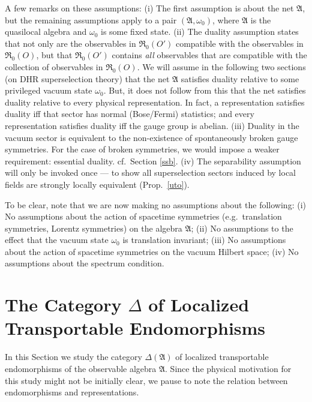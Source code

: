 \documentclass[12pt]{article}
\newcommand{\alg}[1]{\mathfrak{#1}}
\theoremstyle{definition}
\theoremstyle{definition}
\theoremstyle{remark}
\def\al#1{{\mathfrak #1}}
\def\om{\omega} \def\Om{\Omega} \def\dd{\partial} \def\D{\Delta}
\begin{document}
A few remarks on these assumptions: (i) The first assumption is about
the net $\al A$, but the remaining assumptions apply to a pair $(\al
A,\om _0)$, where $\al A$ is the quasilocal algebra and $\om _0$ is
some fixed state.  (ii) The duality assumption states that not only
are the observables in $\alg{R}_0(O')$ compatible with the observables
in $\alg{R}_0(O)$, but that $\alg{R}_0(O')$ contains \emph{all}
observables that are compatible with the collection of observables in
$\alg{R}_0(O)$.  We will assume in the following two sections (on DHR
superselection theory) that the net $\alg{A}$ satisfies duality
relative to some privileged vacuum state $\om _0$.  But, it does not
follow from this that the net satisfies duality relative to every
physical representation.  In fact, a representation satisfies duality
iff that sector has normal (Bose/Fermi) statistics; and every
representation satisfies duality iff the gauge group is abelian.
(iii) Duality in the vacuum sector is equivalent to the non-existence
of spontaneously broken gauge symmetries.  For the case of broken
symmetries, we would impose a weaker requirement: essential duality.
cf.\ Section \ref{ssb}.  (iv) The separability assumption will only be
invoked once --- to show all superselection sectors induced by local
fields are strongly locally equivalent (Prop.\ \ref{uto}).

To be clear, note that we are now making no assumptions about the
following: (i) No assumptions about the action of spacetime symmetries
(e.g.\ translation symmetries, Lorentz symmetries) on the algebra $\al
A$; (ii) No assumptions to the effect that the vacuum state $\om _0$
is translation invariant; (iii) No assumptions about the action of
spacetime symmetries on the vacuum Hilbert space; (iv) No assumptions
about the spectrum condition.


\section{The Category $\D$ of Localized Transportable Endomorphisms}

In this Section we study the category $\D (\al A)$ of localized
transportable endomorphisms of the observable algebra $\al A$.  Since
the physical motivation for this study might not be initially clear,
we pause to note the relation between endomorphisms and
representations.
\end{document}

